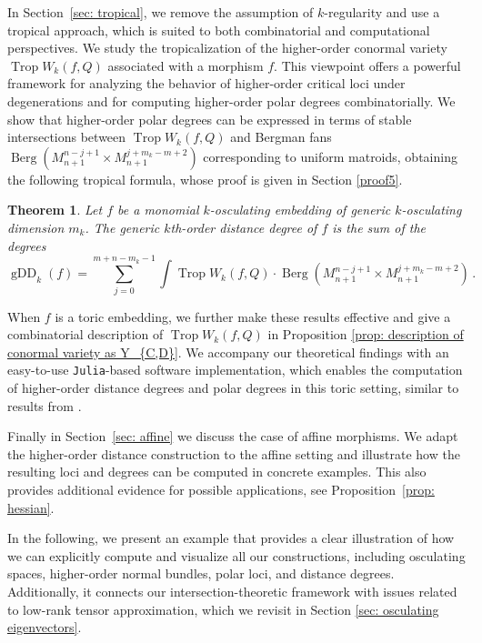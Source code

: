 \documentclass[11pt,reqno]{amsart}
\numberwithin{equation}{section}
\theoremstyle{plain}
\newtheorem{theorem}{Theorem}
\numberwithin{theorem}{section}
\theoremstyle{definition}
\DeclareMathOperator{\Trop}{Trop}
\newcommand{\gDD}{\operatorname{gDD}}
\begin{document}
In Section~\ref{sec: tropical}, we remove the assumption of $k$-regularity and use a tropical approach, 
which is suited to both combinatorial and computational perspectives.
We study the tropicalization of the higher-order conormal variety $\Trop W_k(f,Q)$ associated with a morphism $f$. This viewpoint offers a powerful framework for analyzing the behavior of higher-order critical loci under degenerations and for computing higher-order polar degrees combinatorially. We show that higher-order polar degrees can be expressed in terms of stable intersections between $\Trop W_k(f,Q)$ and Bergman fans $\operatorname{Berg}(M^{n-j+1}_{n+1}\times M^{j+m_k-m+2}_{n+1})$ corresponding to uniform matroids, obtaining the following tropical formula, whose proof is given in Section \ref{proof5}.

\begin{theorem}\label{theorem: tropical description of higher-order multidegrees}
Let $f$ be a monomial $k$-osculating embedding of generic $k$-osculating dimension $m_k$.
The generic $k$th-order distance degree of $f$ is the sum of the degrees
\[
\gDD_k(f) = \sum_{j = 0}^{ m+n-m_k-1 }
\int \Trop W_k(f,Q) \cdot \operatorname{Berg}(M^{n-j+1}_{n+1}\times M^{j+m_k-m+2}_{n+1})\,.
\]
\end{theorem}

When $f$ is a toric embedding, we further make these results effective and give a combinatorial description of $\Trop W_k(f,Q)$ in Proposition \ref{prop: description of conormal variety as Y_{C,D}}.
We accompany our theoretical findings with an easy-to-use \verb|Julia|-based software implementation, which enables the computation of higher-order distance degrees and polar degrees in this toric setting, similar to results from \cite{SturmfelsHelmer}.

Finally in Section~\ref{sec: affine} we discuss the case of affine morphisms. We adapt the higher-order distance construction to the affine setting and illustrate how the resulting loci and degrees can be computed in concrete examples. This also provides additional evidence for possible applications, see Proposition~\ref{prop: hessian}.

In the following, we present an example that provides a clear illustration of how we can explicitly compute and visualize all our constructions, including osculating spaces, higher-order normal bundles, polar loci, and distance degrees. Additionally, it connects our intersection-theoretic framework with issues related to low-rank tensor approximation, which we revisit in Section \ref{sec: osculating eigenvectors}.
\end{document}
